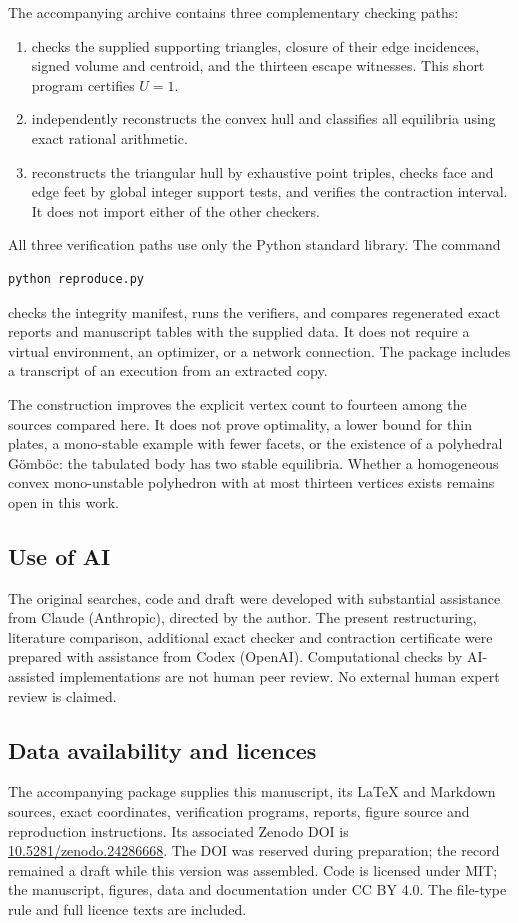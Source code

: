 \documentclass[11pt]{amsart}
\theoremstyle{remark}
\begin{document}
The accompanying archive contains three complementary checking paths:
\begin{enumerate}
\item {} checks the supplied supporting triangles, closure of their edge incidences, signed volume and centroid, and the thirteen escape witnesses. This short program certifies $U=1$.
\item {} independently reconstructs the convex hull and classifies all equilibria using exact rational arithmetic.
\item {} reconstructs the triangular hull by exhaustive point triples, checks face and edge feet by global integer support tests, and verifies the contraction interval. It does not import either of the other checkers.
\end{enumerate}
All three verification paths use only the Python standard library. The command
\begin{verbatim}
python reproduce.py
\end{verbatim}
checks the integrity manifest, runs the verifiers, and compares regenerated exact reports and manuscript tables with the supplied data. It does not require a virtual environment, an optimizer, or a network connection. The package includes a transcript of an execution from an extracted copy.

The construction improves the explicit vertex count to fourteen among the sources compared here. It does not prove optimality, a lower bound for thin plates, a mono-stable example with fewer facets, or the existence of a polyhedral G\"omb\"oc: the tabulated body has two stable equilibria. Whether a homogeneous convex mono-unstable polyhedron with at most thirteen vertices exists remains open in this work.

\subsection*{Use of AI}
The original searches, code and draft were developed with substantial assistance from Claude (Anthropic), directed by the author. The present restructuring, literature comparison, additional exact checker and contraction certificate were prepared with assistance from Codex (OpenAI). Computational checks by AI-assisted implementations are not human peer review. No external human expert review is claimed.

\subsection*{Data availability and licences}
The accompanying package supplies this manuscript, its LaTeX and Markdown sources, exact coordinates, verification programs, reports, figure source and reproduction instructions. Its associated Zenodo DOI is
\href{https://doi.org/10.5281/zenodo.24286668}{10.5281/zenodo.24286668}.
The DOI was reserved during preparation; the record remained a draft while this version was assembled. Code is licensed under MIT; the manuscript, figures, data and documentation under CC BY 4.0. The file-type rule and full licence texts are included.
\end{document}
